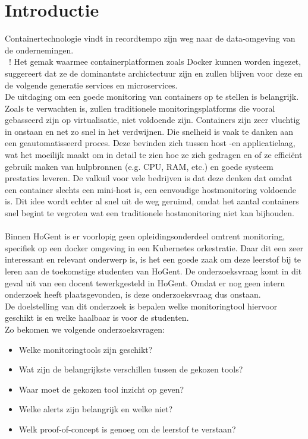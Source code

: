 
\section{Introductie} %
\label{sec:introductie}
Containertechnologie vindt in recordtempo zijn weg naar de data-omgeving van de ondernemingen.\\~\autocite{Cole2016}! Het gemak waarmee containerplatformen zoals Docker kunnen worden ingezet, suggereert dat ze de dominantste archictectuur zijn en zullen blijven voor deze en de volgende generatie services en microservices.
\\
De uitdaging om een goede monitoring van containers op te stellen is belangrijk. Zoals te verwachten is, zullen traditionele monitoringsplatforms die vooral gebasseerd zijn op virtualisatie, niet voldoende zijn. Containers zijn zeer vluchtig in onstaan en net zo snel in het verdwijnen. Die snelheid is vaak te danken aan een geautomatisseerd proces. Deze bevinden zich tussen host -en applicatielaag, wat het moeilijk maakt om in detail te zien hoe ze zich gedragen en of ze efficiënt gebruik maken van hulpbronnen (e.g. CPU, RAM, etc.) en goede systeem prestaties leveren. De valkuil voor vele bedrijven is dat deze denken dat omdat een container slechts een mini-host is, een eenvoudige hostmonitoring voldoende is. Dit idee wordt echter al snel uit de weg geruimd, omdat het aantal containers snel begint te vegroten wat een traditionele hostmonitoring niet kan bijhouden.
\\
\\
Binnen HoGent is er voorlopig geen opleidingsonderdeel omtrent monitoring, specifiek op een docker omgeving in een Kubernetes orkestratie. Daar dit een zeer interessant en relevant onderwerp is, is het een goede zaak om deze leerstof bij te leren aan de toekomstige studenten van HoGent. De onderzoeksvraag komt in dit geval uit van een docent tewerkgesteld in HoGent. Omdat er nog geen intern onderzoek heeft plaatsgevonden, is deze onderzoeksvraag dus onstaan. 
\\
De doelstelling van dit onderzoek is bepalen welke monitoringtool hiervoor geschikt is en welke haalbaar is voor de studenten. 
\\
Zo bekomen we volgende onderzoeksvragen:
\begin{itemize}
    \item Welke monitoringtools zijn geschikt?
    \item Wat zijn de belangrijkste verschillen tussen de gekozen tools?
    \item Waar moet de gekozen tool inzicht op geven?
    \item Welke alerts zijn belangrijk en welke niet?
    \item Welk proof-of-concept is genoeg om de leerstof te verstaan?
\end{itemize}

